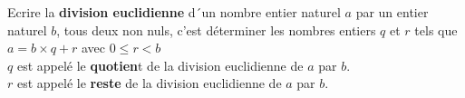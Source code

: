 
Ecrire la \textbf{division euclidienne} d´un nombre entier naturel $a$ par un entier naturel $b$, tous deux non nuls, c'est déterminer les nombres entiers $q$ et $r$ tels que $a=b \times q + r$ avec $0 \leq r < b$\\
$q$ est appelé le \textbf{quotien}t de la division euclidienne de $a$ par $b$.\\
$r$ est appelé le \textbf{reste} de la division euclidienne de $a$ par $b$. 

